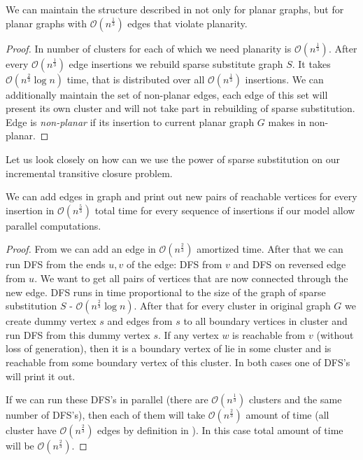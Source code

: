 \begin{theorem}
We can maintain the structure described in \cite{subramanian1993fully} not only for planar graphs, but for planar graphs with $\mathcal{O}(n^{\frac{1}{3}})$ edges that violate planarity. 
\end{theorem}

\begin{proof}
In \cite{subramanian1993fully} number of clusters for each of which we need planarity is $\mathcal{O}(n^{\frac{1}{3}})$. After every $\mathcal{O}(n^{\frac{1}{3}})$ edge insertions we rebuild sparse substitute graph $S$. It takes $\mathcal{O}(n^{\frac{2}{3}}\log n)$ time, that is distributed over all $\mathcal{O}(n^{\frac{1}{3}})$ insertions. We can additionally maintain the set of non-planar edges, each edge of this set will present its own cluster and will not take part in rebuilding of sparse substitution. Edge is \textit{non-planar} if its insertion to current planar graph $G$ makes in non-planar.
\end{proof}

Let us look closely on how can we use the power of sparse substitution on our incremental transitive closure problem.

\begin{theorem}
We can add edges in graph and print out new pairs of reachable vertices for every insertion in $\mathcal{O}(n^{\frac{5}{3}})$ total time for every sequence of insertions if our model allow parallel computations.
\end{theorem}

\begin{proof}
From \cite{subramanian1993fully} we can add an edge in $\mathcal{O}(n^{\frac{2}{3}})$ amortized time. After that we can run DFS from the ends $u, v$ of the edge: DFS from $v$ and DFS on reversed edge from $u$. We want to get all pairs of vertices that are now connected through the new edge. DFS runs in time proportional to the size of the graph of sparse substitution $S$ - $\mathcal{O}(n^{\frac{2}{3}} \log n)$. After that for every cluster in original graph $G$ we create dummy vertex $s$ and edges from $s$ to all boundary vertices in cluster and run DFS from this dummy vertex $s$. If any vertex $w$ is reachable from $v$ (without loss of generation), then it is a boundary vertex of lie in some cluster and is reachable from some boundary vertex of this cluster. In both cases one of DFS's will print it out.

If we can run these DFS's in parallel (there are $\mathcal{O}(n^{\frac{1}{3}})$ clusters and the same number of DFS's), then each of them will take $\mathcal{O}(n^{\frac{2}{3}})$ amount of time (all cluster have $\mathcal{O}(n^{\frac{2}{3}})$ edges by definition in \cite{subramanian1993fully}). In this case total amount of time will be $\mathcal{O}(n^{\frac{2}{3}})$.
\end{proof}


